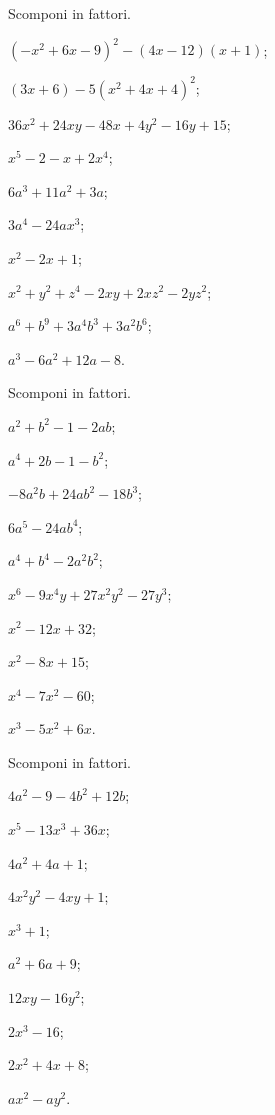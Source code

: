 \begin{esercizio}[\Ast]
 \label{ese:13.100}
 Scomponi in fattori.
\begin{multicols}{2}
 \begin{enumeratea}
\item $(-x^{2}+6x-9)^{2}-(4x-12)(x+1)$;
\item $(3x+6)-5(x^{2}+4x+4)^{2}$;
\item $36x^{2}+24xy-48x+4y^{2}-16y+15$;
\item $x^{5}-2-x+2x^{4}$;
\item $6a^{3}+11a^{2}+3a$;
\item $3a^{4}-24ax^{3}$;
\item $x^{2}-2x+1$;
\item $x^{2}+y^{2}+z^{4}-2xy+2{xz}^{2}-2{yz}^{2}$;
\item $a^{6}+b^{9}+3a^{4}b^{3}+3a^{2}b^{6}$;
\item $a^{3}-6a^{2}+12a-8$.
 \end{enumeratea}
\end{multicols}
\end{esercizio}


\begin{esercizio}
 \label{ese:13.101}
 Scomponi in fattori.
 \begin{multicols}{2}
 \begin{enumeratea}
 \item $a^{2}+b^{2}-1-2{ab}$;
\item $a^{4}+2b-1-b^{2}$;
\item $-8a^{2}b+24{ab}^{2}-18b^{3}$;
\item $6a^{5}-24{ab}^{4}$;
\item $a^{4}+b^{4}-2a^{2}b^{2}$;
\item $x^{6}-9x^{4}y+27x^{2}y^{2}-27y^{3}$;
\item $x^{2}-12x+32$;
\item $x^{2}-8x+15$;
\item $x^{4}-7x^{2}-60$;
\item $x^{3}-5x^{2}+6x$.
 \end{enumeratea}
 \end{multicols}
\end{esercizio}

\begin{esercizio}
 \label{ese:13.102}
 Scomponi in fattori.
 \begin{multicols}{2}
 \begin{enumeratea}
  \item $4a^{2}-9-4b^{2}+12b$;
\item $x^{5}-13x^{3}+36x$;
\item $4a^{2}+4a+1$;
\item $4x^{2}y^{2}-4xy+1$;
\item $x^{3}+1$;
\item $a^{2}+6a+9$;
\item $12xy-16y^{2}$;
\item $2x^{3}-16$;
\item $2x^{2}+4x+8$;
\item $ax^{2}-{ay}^{2}$.
 \end{enumeratea}
 \end{multicols}
\end{esercizio}

